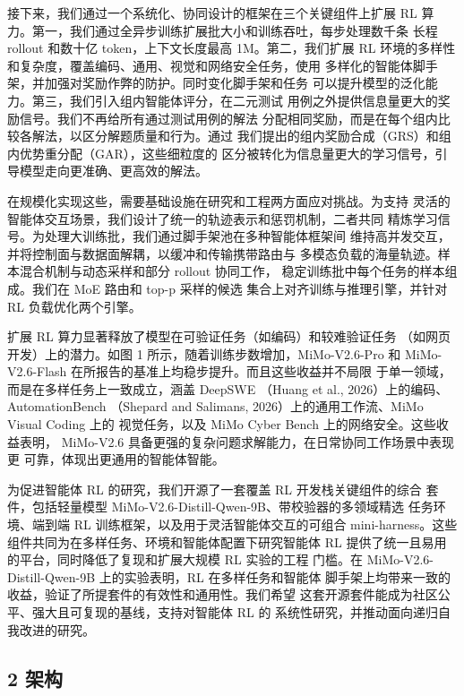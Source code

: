 接下来，我们通过一个系统化、协同设计的框架在三个关键组件上扩展 RL
算力。第一，我们通过全异步训练扩展批大小和训练吞吐，每步处理数千条
长程 rollout 和数十亿 token，上下文长度最高 1M。第二，我们扩展 RL
环境的多样性和复杂度，覆盖编码、通用、视觉和网络安全任务，使用
多样化的智能体脚手架，并加强对奖励作弊的防护。同时变化脚手架和任务
可以提升模型的泛化能力。第三，我们引入组内智能体评分，在二元测试
用例之外提供信息量更大的奖励信号。我们不再给所有通过测试用例的解法
分配相同奖励，而是在每个组内比较各解法，以区分解题质量和行为。通过
我们提出的组内奖励合成（GRS）和组内优势重分配（GAR），这些细粒度的
区分被转化为信息量更大的学习信号，引导模型走向更准确、更高效的解法。

在规模化实现这些，需要基础设施在研究和工程两方面应对挑战。为支持
灵活的智能体交互场景，我们设计了统一的轨迹表示和惩罚机制，二者共同
精炼学习信号。为处理大训练批，我们通过脚手架池在多种智能体框架间
维持高并发交互，并将控制面与数据面解耦，以缓冲和传输携带路由与
多模态负载的海量轨迹。样本混合机制与动态采样和部分 rollout 协同工作，
稳定训练批中每个任务的样本组成。我们在 MoE 路由和 top-p 采样的候选
集合上对齐训练与推理引擎，并针对 RL 负载优化两个引擎。

扩展 RL 算力显著释放了模型在可验证任务（如编码）和较难验证任务
（如网页开发）上的潜力。如图 1 所示，随着训练步数增加，MiMo-V2.6-Pro
和 MiMo-V2.6-Flash 在所报告的基准上均稳步提升。而且这些收益并不局限
于单一领域，而是在多样任务上一致成立，涵盖 DeepSWE
（Huang et al., 2026）上的编码、AutomationBench
（Shepard and Salimans, 2026）上的通用工作流、MiMo Visual Coding 上的
视觉任务，以及 MiMo Cyber Bench 上的网络安全。这些收益表明，
MiMo-V2.6 具备更强的复杂问题求解能力，在日常协同工作场景中表现更
可靠，体现出更通用的智能体智能。

为促进智能体 RL 的研究，我们开源了一套覆盖 RL 开发栈关键组件的综合
套件，包括轻量模型 MiMo-V2.6-Distill-Qwen-9B、带校验器的多领域精选
任务环境、端到端 RL 训练框架，以及用于灵活智能体交互的可组合
mini-harness。这些组件共同为在多样任务、环境和智能体配置下研究智能体
RL 提供了统一且易用的平台，同时降低了复现和扩展大规模 RL 实验的工程
门槛。在 MiMo-V2.6-Distill-Qwen-9B 上的实验表明，RL 在多样任务和智能体
脚手架上均带来一致的收益，验证了所提套件的有效性和通用性。我们希望
这套开源套件能成为社区公平、强大且可复现的基线，支持对智能体 RL 的
系统性研究，并推动面向递归自我改进的研究。

\subsection{2 架构}\label{architecture}

